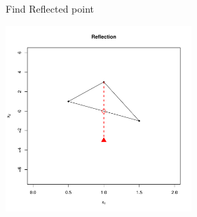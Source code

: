 \documentclass[10pt]{beamer}
\begin{document}
                                                                                              \begin{frame}{Find Reflected point}
                                                                                                \begin{center}
                                                                                                  \includegraphics[height=7cm]{RCode/nmrefl1.pdf}
                                                                                                \end{center}
                                                                                              \end{frame}
\end{document}
